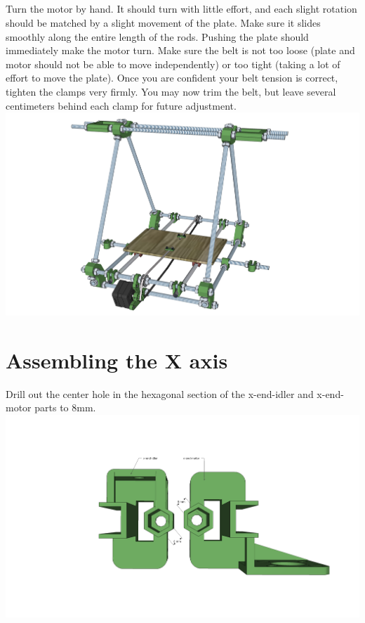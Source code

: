 \documentclass[twoside,openany,a4paper,titlepage]{memoir}
\begin{document}
	\section{}
	Turn the motor by hand. It should turn with little effort, and each slight rotation should be matched by a
	slight movement of the plate. Make sure it slides smoothly along the entire length of the rods. Pushing
	the plate should immediately make the motor turn. Make sure the belt is not too loose (plate and motor
	should not be able to move independently) or too tight (taking a lot of effort to move the plate). Once
	you are confident your belt tension is correct, tighten the clamps very firmly. You may now trim the belt,
	but leave several centimeters behind each clamp for future adjustment.\\
	\includegraphics[width=1\linewidth]{graphics/ch6_29.png}
	
	\chapter{Assembling the X axis}
	Drill out the center hole in the hexagonal section of the x-end-idler and x-end-motor parts to 8mm.\\
	\includegraphics[width=1\linewidth]{graphics/ch7_1.png}
	
\end{document}

